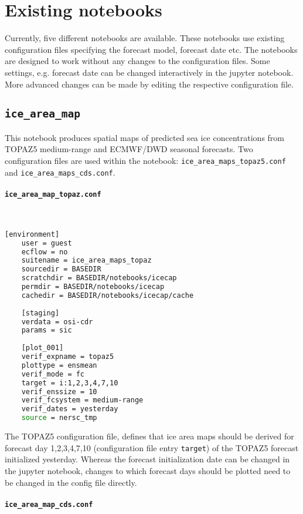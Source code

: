\documentclass[DIV=10, parskip=full]{scrreprt}
\begin{document}
\section{Existing notebooks}
Currently, five different notebooks are available. These notebooks use existing configuration files specifying the forecast model, forecast date etc. The notebooks are designed to work without any changes to the configuration files. Some settings, e.g. forecast date can be changed interactively in the jupyter notebook. More advanced changes can be made by editing the respective configuration file.   

\subsection{\texttt{ice\_area\_map}}
This notebook produces spatial maps of predicted sea ice concentrations from TOPAZ5 medium-range and ECMWF/DWD seasonal forecasts. Two configuration files are used within the notebook: \texttt{ice\_area\_maps\_topaz5.conf} and \texttt{ice\_area\_maps\_cds.conf}.

\paragraph{\texttt{ice\_area\_map\_topaz.conf}}\mbox{}\\
\begin{lstlisting}[language=bash]
	[environment]
	user = guest
	ecflow = no
	suitename = ice_area_maps_topaz
	sourcedir = BASEDIR
	scratchdir = BASEDIR/notebooks/icecap
	permdir = BASEDIR/notebooks/icecap
	cachedir = BASEDIR/notebooks/icecap/cache
	
	[staging]
	verdata = osi-cdr
	params = sic
	
	[plot_001]
	verif_expname = topaz5
	plottype = ensmean
	verif_mode = fc
	target = i:1,2,3,4,7,10
	verif_enssize = 10
	verif_fcsystem = medium-range
	verif_dates = yesterday
	source = nersc_tmp
\end{lstlisting}

The TOPAZ5 configuration file, defines that ice area maps should be derived for forecast day 1,2,3,4,7,10 (configuration file entry \texttt{target}) of the TOPAZ5 forecast initialized yesterday. Whereas the forecast initialization date can be changed in the jupyter notebook, changes to which forecast days should be plotted need to be changed in the config file directly.

\paragraph{\texttt{ice\_area\_map\_cds.conf}}\mbox{}\\
\end{document}

